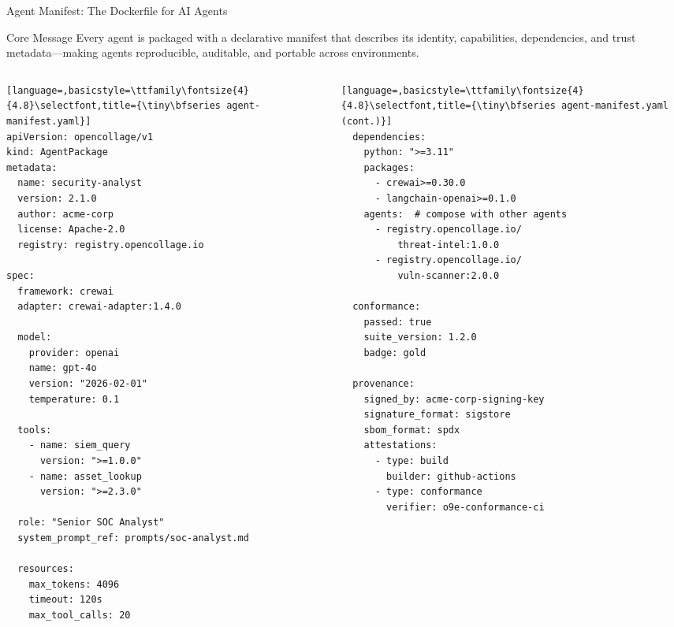 \begin{frame}[fragile]{\fontsize{10}{12}\selectfont Agent Manifest: The Dockerfile for AI Agents}
  \vspace{-0.3cm}
  \begin{block}{\scriptsize Core Message}
    \scriptsize
    Every agent is packaged with a declarative manifest that describes its identity,
    capabilities, dependencies, and trust metadata---making agents reproducible,
    auditable, and portable across environments.
  \end{block}

  \vspace{-0.5cm}

  \begin{columns}[T]
    \begin{column}{0.50\textwidth}
      \begin{lstlisting}[language=,basicstyle=\ttfamily\fontsize{4}{4.8}\selectfont,title={\tiny\bfseries agent-manifest.yaml}]
apiVersion: opencollage/v1
kind: AgentPackage
metadata:
  name: security-analyst
  version: 2.1.0
  author: acme-corp
  license: Apache-2.0
  registry: registry.opencollage.io

spec:
  framework: crewai
  adapter: crewai-adapter:1.4.0

  model:
    provider: openai
    name: gpt-4o
    version: "2026-02-01"
    temperature: 0.1

  tools:
    - name: siem_query
      version: ">=1.0.0"
    - name: asset_lookup
      version: ">=2.3.0"

  role: "Senior SOC Analyst"
  system_prompt_ref: prompts/soc-analyst.md

  resources:
    max_tokens: 4096
    timeout: 120s
    max_tool_calls: 20
      \end{lstlisting}
    \end{column}
    \begin{column}{0.50\textwidth}
      \begin{lstlisting}[language=,basicstyle=\ttfamily\fontsize{4}{4.8}\selectfont,title={\tiny\bfseries agent-manifest.yaml (cont.)}]
  dependencies:
    python: ">=3.11"
    packages:
      - crewai>=0.30.0
      - langchain-openai>=0.1.0
    agents:  # compose with other agents
      - registry.opencollage.io/
          threat-intel:1.0.0
      - registry.opencollage.io/
          vuln-scanner:2.0.0

  conformance:
    passed: true
    suite_version: 1.2.0
    badge: gold

  provenance:
    signed_by: acme-corp-signing-key
    signature_format: sigstore
    sbom_format: spdx
    attestations:
      - type: build
        builder: github-actions
      - type: conformance
        verifier: o9e-conformance-ci
      \end{lstlisting}


\end{column}
\end{columns}
\end{frame}
